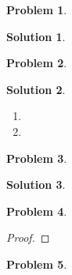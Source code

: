 \documentclass[10pt]{article}
\author{}
\title{}
\date{\today}
\theoremstyle{plain}
\theoremstyle{definition}
\newtheorem{prob}{Problem}
\newtheorem*{sol}{Solution}
\theoremstyle{remark}
\begin{document}
\begin{prob}

\end{prob}

\medskip

\begin{sol}

\end{sol}

\pagebreak

\begin{prob}

\end{prob}

\medskip

\begin{sol}

\end{sol}

\medskip

\begin{enumerate}[label=(\roman*)]
    \item 
    \item 
\end{enumerate}

\pagebreak

\begin{prob}

\end{prob}

\medskip

\begin{sol}

\end{sol}

\medskip

\begin{description}
    \item 
    \item 
\end{description}

\pagebreak

\begin{prob}

\end{prob}

\medskip

\begin{proof}

\end{proof}

\pagebreak

\begin{prob}

\end{prob}
\end{document}
